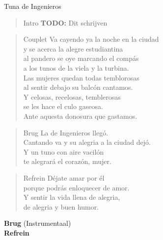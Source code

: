\begin{song}{Tuna de Ingenieros}

\begin{verse}{Intro}
\textbf{TODO:} Dit schrijven
\end{verse}

\begin{verse}{Couplet}
Va cayendo ya la noche en la ciudad\\
y se acerca la alegre estudiantina\\
al pandero se oye marcando el compás\chord{}\\
a los tunos de la viela y la turbina.\\
Las mujeres quedan todas temblorosas\chord{}\\
al sentir debajo su balcón cantamos.\\
Y celosas, recelosas, temblerosas\\
se les hace el culo gaseosa.\\
Ante aquesta donosura que gastamos.
\end{verse}

\begin{verse}{Brug}
\phantom{xxxxx}La de Ingenieros llegó.\\
Cantando va y su alegria a la ciudad dejó.\\
Y un tuno con aire vacilón\chord{}\\
te alegrará el corazón, mujer.
\end{verse}

\begin{verse}{Refrein}
Déjate amar por él\\
porque podrás enloquecer de amor.\\
Y sentir la vida llena de alegria,\\
de alegria y buen humor.
\end{verse}

\textbf {Brug} (Instrumentaal)\\
\textbf {Refrein}
\end{song}
